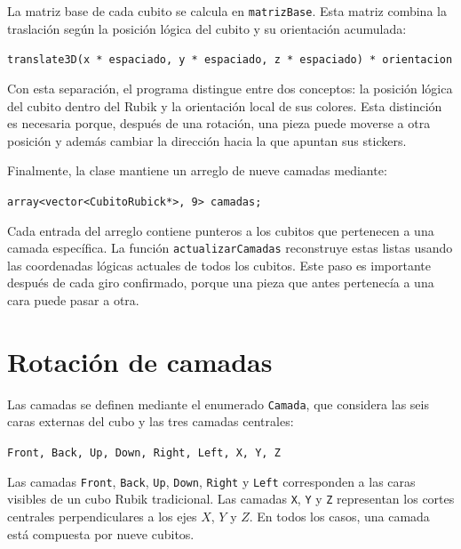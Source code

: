 \documentclass[12pt,a4paper]{article}
\begin{document}
La matriz base de cada cubito se calcula en \texttt{matrizBase}. Esta matriz combina la traslación según la posición lógica del cubito y su orientación acumulada:

\begin{center}
\texttt{translate3D(x * espaciado, y * espaciado, z * espaciado) * orientacion}
\end{center}

Con esta separación, el programa distingue entre dos conceptos: la posición lógica del cubito dentro del Rubik y la orientación local de sus colores. Esta distinción es necesaria porque, después de una rotación, una pieza puede moverse a otra posición y además cambiar la dirección hacia la que apuntan sus stickers.

Finalmente, la clase mantiene un arreglo de nueve camadas mediante:

\begin{center}
\texttt{array<vector<CubitoRubick*>, 9> camadas;}
\end{center}

Cada entrada del arreglo contiene punteros a los cubitos que pertenecen a una camada específica. La función \texttt{actualizarCamadas} reconstruye estas listas usando las coordenadas lógicas actuales de todos los cubitos. Este paso es importante después de cada giro confirmado, porque una pieza que antes pertenecía a una cara puede pasar a otra.

\section{Rotación de camadas}

Las camadas se definen mediante el enumerado \texttt{Camada}, que considera las seis caras externas del cubo y las tres camadas centrales:

\begin{center}
\texttt{Front, Back, Up, Down, Right, Left, X, Y, Z}
\end{center}

Las camadas \texttt{Front}, \texttt{Back}, \texttt{Up}, \texttt{Down}, \texttt{Right} y \texttt{Left} corresponden a las caras visibles de un cubo Rubik tradicional. Las camadas \texttt{X}, \texttt{Y} y \texttt{Z} representan los cortes centrales perpendiculares a los ejes $X$, $Y$ y $Z$. En todos los casos, una camada está compuesta por nueve cubitos.
\end{document}
